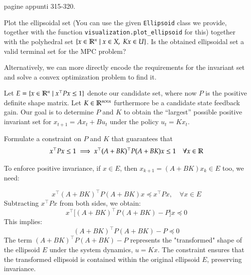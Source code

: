 \documentclass[]{article}
\begin{document}
\begin{flushleft}
	pagine appunti 315-320.
\end{flushleft}



\begin{assignment}
	Plot the ellipsoidal set 
	(You can use the given \texttt{Ellipsoid} class we provide,
	together with the function \texttt{visualization.plot\_ellipsoid} for this)
	together with the polyhedral set $\{ x \in \mathbb{R}^n \mid x \in X,\; Kx \in U \}$.
	Is the obtained ellipsoidal set a valid terminal set for the MPC problem?
\end{assignment}


Alternatively, we can more directly encode the requirements for the 
invariant set and solve a convex optimization problem 
to find it. 

Let $E = \{ x \in \mathbb{R}^n \mid x^\top P x \leq 1 \}$ denote our candidate set, where 
now $P$ is the positive definite shape matrix. 
Let $K \in \mathbb{R}^{m \times n}$ furthermore be a candidate state feedback gain.
Our goal is to determine 
$P$ and $K$ to obtain the ``largest'' possible positive invariant set for 
$x_{t+1} = A x_t + B u_t$ under the policy $u_t = K x_t$.


\begin{assignment}
	Formulate a constraint on $P$ and $K$ that guarantees that 
	\[ 
		x^\top P x \leq 1 \implies x^\top(A + BK)^\top P (A + BK)x \leq 1  \quad \forall x \in \mathbb{R}
	\]
\end{assignment}
\begin{flushleft}
	To enforce positive invariance, if $x \in E$, then $x_{k+1} = (A + BK) x_k \in E$ too, we need:
\end{flushleft}
\begin{equation}
	x^\top(A + BK)^\top P (A + BK)x \preceq x^\top P x, \quad \forall x \in E
\end{equation}
Subtracting $x^\top P x$ from both sides, we obtain:
\begin{equation}
	x^\top\Big[ (A + BK)^\top P (A + BK) - P \Big] x \preceq 0
\end{equation}
This implies:
\begin{equation}
	(A + BK)^\top P (A + BK) - P \preceq 0
\end{equation}
The term $(A + BK)^\top P (A + BK) - P$ represents the "transformed" shape of the ellipsoid $E$ under the system dynamics, $u = Kx$. The constraint ensures that the transformed ellipsoid is contained within the original ellipsoid $E$, preserving invariance.
\end{document}
